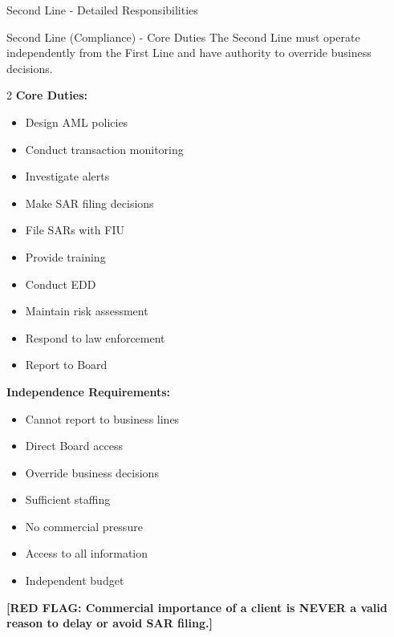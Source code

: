 \documentclass[11pt,a4paper]{beamer}
\newcommand{\redflag}[1]{\textcolor{red!80!black}{\textbf{[RED FLAG: #1]}}}
\begin{document}
	\begin{frame}{Second Line - Detailed Responsibilities}
		\begin{block}{Second Line (Compliance) - Core Duties}
			The Second Line must operate independently from the First Line and have authority to override business decisions.
		\end{block}
		\begin{multicols}{2}
			\textbf{Core Duties:}
			\begin{itemize}
				\item Design AML policies
				\item Conduct transaction monitoring
				\item Investigate alerts
				\item Make SAR filing decisions
				\item File SARs with FIU
				\item Provide training
				\item Conduct EDD
				\item Maintain risk assessment
				\item Respond to law enforcement
				\item Report to Board
			\end{itemize}
			\columnbreak
			\textbf{Independence Requirements:}
			\begin{itemize}
				\item Cannot report to business lines
				\item Direct Board access
				\item Override business decisions
				\item Sufficient staffing
				\item No commercial pressure
				\item Access to all information
				\item Independent budget
			\end{itemize}
		\end{multicols}
		\redflag{Commercial importance of a client is NEVER a valid reason to delay or avoid SAR filing.}
	\end{frame}
	
\end{document}

